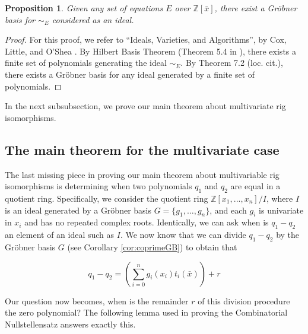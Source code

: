 \documentclass{msthesis}
\newtheorem{prop}[theorem]{Proposition}
\theoremstyle{definition}
\newcommand{\ints}{\mathbb{Z}}
\begin{document}
\begin{prop}\label{prop:existsgb}
    Given any set of equations $E$ over $\ints[\bar{x}]$, there exist a Gr\"obner basis for $\sim_E$ considered as an ideal.
\end{prop}
\begin{proof}
    For this proof, we refer to ``Ideals, Varieties, and Algorithms'', by Cox, Little, and O'Shea \cite{cox2010}.  By Hilbert Basis Theorem (Theorem 5.4 in \cite{cox2010}), there exists a finite set of polynomials generating the ideal $\sim_E$.  By Theorem 7.2 (loc. cit.), there exists a Gr\"obner basis for any ideal generated by a finite set of polynomials.
\end{proof}

In the next subsubsection, we prove our main theorem about multivariate rig isomorphisms.

\subsection{The main theorem for the multivariate case}

The last missing piece in proving our main theorem about multivariable rig isomorphisms is determining when two polynomials $q_1$ and $q_2$ are equal in a quotient ring.  Specifically, we consider the quotient ring $\ints[x_1, ..., x_n]/I$, where $I$ is an ideal generated by a Gr\"obner basis $G = \{g_1, \dots, g_n\}$, and each $g_i$ is univariate in $x_i$ and has no repeated complex roots.  Identically, we can ask when is $q_1 - q_2$ an element of an ideal such as $I$. We now know that we can divide $q_1-q_2$ by the Gr\"obner basis $G$ (see Corollary \ref{cor:coprimeGB}) to obtain that

\[ q_1-q_2 = \left(\sum_{i=0}^n g_i(x_i)t_i(\bar{x})\right) + r\]

Our question now becomes, when is the remainder $r$ of this division procedure the zero polynomial?  The following lemma used in proving the Combinatorial Nullstellensatz answers exactly this.
\end{document}
